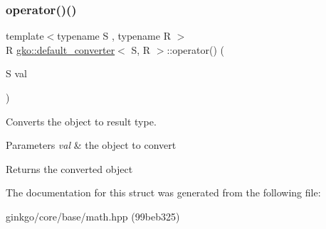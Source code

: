 \subsubsection{\texorpdfstring{operator()()}{operator()()}}
{\footnotesize\ttfamily template$<$typename S , typename R $>$ \\
R \hyperlink{structgko_1_1default__converter}{gko\+::default\+\_\+converter}$<$ S, R $>$\+::operator() (\begin{DoxyParamCaption}\item[{S}]{val }\end{DoxyParamCaption})}



Converts the object to result type. 


\begin{DoxyParams}{Parameters}
{\em val} & the object to convert \\
\hline
\end{DoxyParams}
\begin{DoxyReturn}{Returns}
the converted object 
\end{DoxyReturn}


The documentation for this struct was generated from the following file\+:\begin{DoxyCompactItemize}
\item 
ginkgo/core/base/math.\+hpp (99beb325)\end{DoxyCompactItemize}
